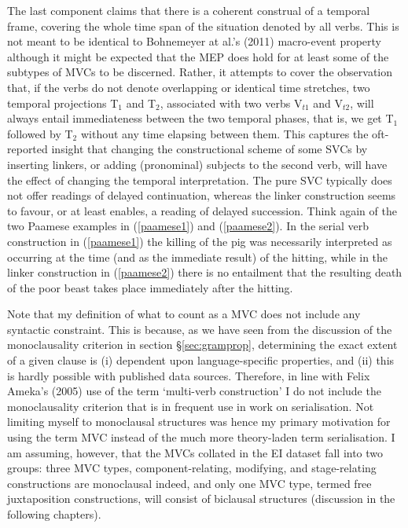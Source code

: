 The last component claims that there is a coherent construal of a temporal frame, covering the whole time span of the situation denoted by all verbs. This is not meant to be identical to Bohnemeyer at al.'s (2011) macro-event property although it might be expected that the MEP does hold for at least some of the subtypes of MVCs to be discerned. Rather, it attempts to cover the observation that, if the verbs do not denote overlapping or identical time stretches, two temporal projections T$_1$ and T$_2$, associated with two verbs V$_{t1}$ and V$_{t2}$, will always entail immediateness between the two temporal phases, that is, we get T$_1$ followed by T$_2$ without any time elapsing between them. This captures the oft-reported insight that changing the constructional scheme of some SVCs by inserting linkers, or adding (pronominal) subjects to the second verb, will have the effect of changing the temporal interpretation. The pure SVC typically does not offer readings of delayed continuation, whereas the linker construction seems to favour, or at least enables, a reading of delayed succession. Think again of the two Paamese examples in (\ref{paamese1}) and (\ref{paamese2}). In the serial verb construction in (\ref{paamese1}) the killing of the pig was necessarily interpreted as occurring at the time (and as the immediate result) of the hitting, while in the linker construction in (\ref{paamese2}) there is no entailment that the resulting death of the poor beast takes place immediately after the hitting.

Note that my definition of what to count as a MVC does not include any syntactic constraint. This is because, as we have seen from the discussion of the monoclausality criterion in section §\ref{sec:gramprop}, determining the exact extent of a given clause is (i) dependent upon language-specific properties, and (ii) this is hardly possible with published data sources. Therefore, in line with Felix Ameka's (2005) use of the term `multi-verb construction' I do not include the monoclausality criterion that is in frequent use in work on serialisation. Not limiting myself to monoclausal structures was hence my primary motivation for using the term MVC instead of the much more theory-laden term serialisation. I am assuming, however, that the MVCs collated in the EI dataset fall into two groups: three MVC types, component-relating, modifying, and stage-relating constructions are monoclausal indeed, and only one MVC type, termed free juxtaposition constructions, will consist of biclausal structures (discussion in the following chapters). 

